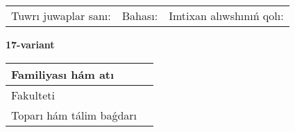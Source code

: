 \documentclass{article}
\begin{document}
\vspace{1cm}

\begin{tabular}{lll}
Tuwrı juwaplar sanı: \underline{\hspace{1.5cm}} & 
Bahası: \underline{\hspace{1.5cm}} & 
Imtixan alıwshınıń qolı: \underline{\hspace{2cm}} \\
\end{tabular}

\egroup

\newpage


\textbf{17-variant}\\

\bgroup
\def\arraystretch{1.6} %

\begin{tabular}{|m{5.7cm}|m{9.5cm}|}
\hline
Familiyası hám atı & \\
\hline
Fakulteti  & \\
\hline
Toparı hám tálim baǵdarı  & \\
\hline
\end{tabular}

\vspace{1cm}
\end{document}
